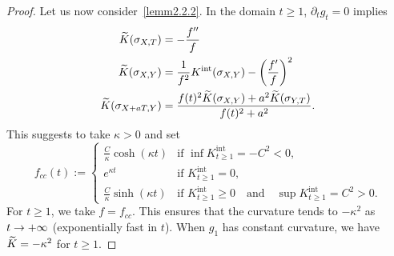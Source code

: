 \documentclass[10pt]{amsart}
\theoremstyle{definition}\newtheorem{defi}[theo]{Definition}\newtheorem{rema}[theo]{Remark}\newtheorem{exam}[theo]{Example}\newtheorem{exem}[theo]{Example}\newtheorem{nota}[theo]{Notation}
\DeclareMathOperator{\intt}{int}
\theoremstyle{plain}
\let\oldtilde\tilde
\renewcommand*{\tilde}[1]{\mathchoice{\widetilde{#1}}{\widetilde{#1}}{\oldtilde{#1}}{\oldtilde{#1}}}
\renewcommand*{\to}{\mathchoice{\longrightarrow}{\rightarrow}{\rightarrow}{\rightarrow}}
\begin{document}
\begin{proof}
Let us now consider~\eqref{lemm2.2.2}. In the domain $t\geq 1$, $\partial_t g_t = 0$ implies
\begin{align*}
\tilde{K}(\sigma_{X,T}) &= -\frac{f''}{f} \\
\tilde{K}(\sigma_{X,Y}) &= \frac{1}{f^2}K^{\intt}(\sigma_{X,Y}) - \left(\frac{f'}{f}\right)^2\\
\tilde{K}(\sigma_{X+aT,Y})&= \frac{ f(t)^2 \tilde{K}(\sigma_{X,Y}) + a^2 \tilde{K}(\sigma_{Y,T})}{f(t)^2+ a^2}.
\end{align*}
This suggests to take $\kappa>0$ and set
\begin{equation}\label{eq:f-away}
f_{cc}(t):=
\begin{cases}
\frac{C}{\kappa} \cosh(\kappa t) & \text{if }\inf K^{\intt}_{t\geq 1} = - C^2<0,\\
e^{\kappa t} &\text{if }K^{\intt}_{t\geq1} =0,\\
\frac{C}{\kappa} \sinh(\kappa t) & \text{if }K^{\intt}_{t\geq 1}\geq 0\quad\text{and}\quad\sup K^{\intt}_{t\geq 1} = C^2 >0.
\end{cases}
\end{equation}
For $t\geq 1$, we take $f= f_{cc}$. This ensures that the curvature tends to $-\kappa^2$ as $t\to+\infty$ (exponentially fast in $t$). When $g_{1}$ has constant curvature, we have $\tilde{K}=-\kappa^2$ for $t\geq 1$.


\end{proof}
\end{document}
